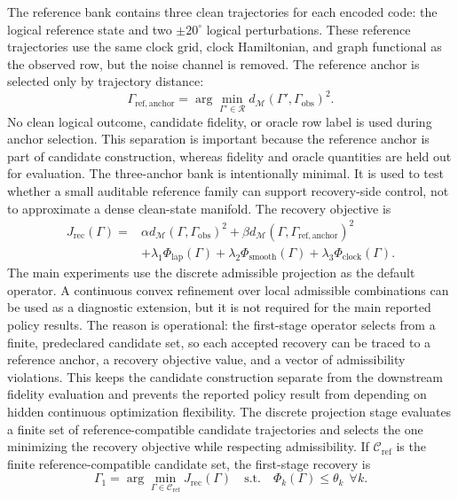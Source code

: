 \documentclass[11pt]{article}
\numberwithin{equation}{section}
\begin{document}
The reference bank contains three clean trajectories for each encoded code: the
logical reference state and two $\pm 20^\circ$ logical perturbations. These
reference trajectories use the same clock grid, clock Hamiltonian, and graph
functional as the observed row, but the noise channel is removed. The reference
anchor is selected only by trajectory distance:
\begin{equation}
\Gamma_{\mathrm{ref,anchor}}
=
\arg\min_{\Gamma'\in\mathcal R}
d_{\mathcal M}(\Gamma',\Gamma_{\mathrm{obs}})^2.
\end{equation}
No clean logical outcome, candidate fidelity, or oracle row label is used during
anchor selection. This separation is important because the reference anchor is
part of candidate construction, whereas fidelity and oracle quantities are held
out for evaluation.
The three-anchor bank is intentionally minimal. It is used to test whether a
small auditable reference family can support recovery-side control, not to
approximate a dense clean-state manifold.
The recovery objective is
\begin{align}
J_{\mathrm{rec}}(\Gamma)
=&
\alpha d_{\mathcal M}(\Gamma,\Gamma_{\mathrm{obs}})^2
+
\beta d_{\mathcal M}(\Gamma,\Gamma_{\mathrm{ref,anchor}})^2
\nonumber\\
&+
\lambda_1\Phi_{\mathrm{lap}}(\Gamma)
+
\lambda_2\Phi_{\mathrm{smooth}}(\Gamma)
+
\lambda_3\Phi_{\mathrm{clock}}(\Gamma).
\end{align}
The main experiments use the discrete admissible projection as the default
operator. A continuous convex refinement over local admissible combinations can be
used as a diagnostic extension, but it is not required for the main reported
policy results.
The reason is operational: the first-stage operator selects from a finite,
predeclared candidate set, so each accepted recovery can be traced to a reference
anchor, a recovery objective value, and a vector of admissibility violations. This
keeps the candidate construction separate from the downstream fidelity
evaluation and prevents the reported policy result from depending on hidden
continuous optimization flexibility.
The discrete projection stage evaluates a finite set of reference-compatible
candidate trajectories and selects the one minimizing the recovery objective while
respecting admissibility. If $\mathcal C_{\mathrm{ref}}$ is the finite
reference-compatible candidate set, the first-stage recovery is
\begin{equation}
\Gamma_1
=
\arg\min_{\Gamma\in\mathcal C_{\mathrm{ref}}}
J_{\mathrm{rec}}(\Gamma)
\quad
\mathrm{s.t.}\quad
\Phi_k(\Gamma)\le \theta_k\ \ \forall k .
\end{equation}
\end{document}
